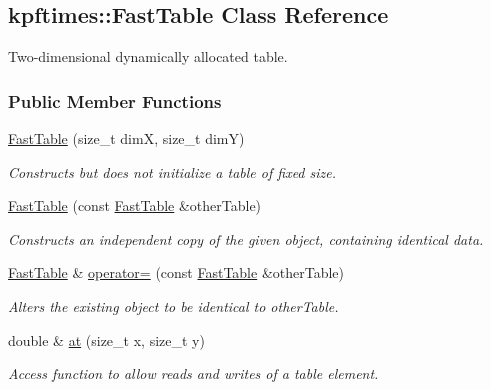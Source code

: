 \hypertarget{classkpftimes_1_1_fast_table}{
\subsection{kpftimes::FastTable Class Reference}
\label{classkpftimes_1_1_fast_table}
}


Two-\/dimensional dynamically allocated table.  


\subsubsection*{Public Member Functions}
\begin{DoxyCompactItemize}
\item 
\hyperlink{classkpftimes_1_1_fast_table_ad3521d0b64b71f0ad53515a968592461}{FastTable} (size\_\-t dimX, size\_\-t dimY)
\begin{DoxyCompactList}\small\item\em Constructs but does not initialize a table of fixed size. \end{DoxyCompactList}\item 
\hyperlink{classkpftimes_1_1_fast_table_a7779e369693fcfb7b45fc80a95a1c0c6}{FastTable} (const \hyperlink{classkpftimes_1_1_fast_table}{FastTable} \&otherTable)
\begin{DoxyCompactList}\small\item\em Constructs an independent copy of the given object, containing identical data. \end{DoxyCompactList}\item 
\hyperlink{classkpftimes_1_1_fast_table}{FastTable} \& \hyperlink{classkpftimes_1_1_fast_table_a3495b0bccb0b5d165892a2fab5645dd7}{operator=} (const \hyperlink{classkpftimes_1_1_fast_table}{FastTable} \&otherTable)
\begin{DoxyCompactList}\small\item\em Alters the existing object to be identical to otherTable. \end{DoxyCompactList}\item 
double \& \hyperlink{classkpftimes_1_1_fast_table_a2afaf3ba8f1a699a85c943f278db5c67}{at} (size\_\-t x, size\_\-t y)
\begin{DoxyCompactList}\small\item\em Access function to allow reads and writes of a table element. \end{DoxyCompactList}\end{DoxyCompactItemize}


